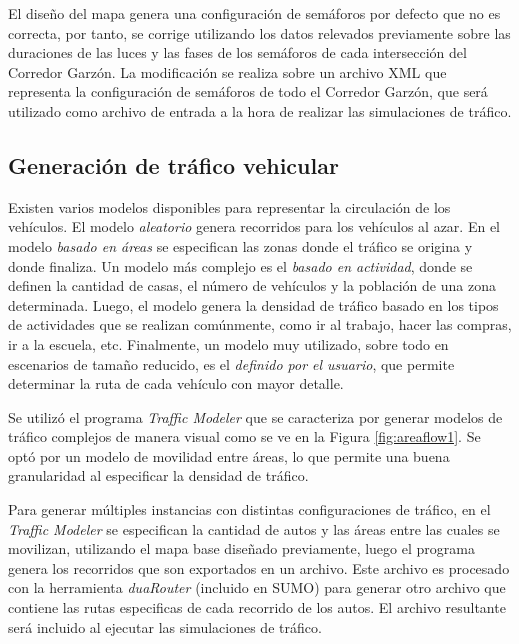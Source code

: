 El diseño del mapa genera una configuración de semáforos por defecto que no es correcta, por tanto, se corrige utilizando los datos relevados previamente sobre las duraciones de las luces y las fases de los semáforos de cada intersección del Corredor Garzón. La modificación se realiza sobre un archivo XML que representa la configuración de semáforos de todo el Corredor Garzón, que será utilizado como archivo de entrada a la hora de realizar las simulaciones de tráfico.

\subsection{Generación de tráfico vehicular}

Existen varios modelos disponibles para representar la circulación de los vehículos. El modelo \emph{aleatorio} genera recorridos para los vehículos al azar. En el modelo \emph{basado en áreas} se especifican las zonas donde el tráfico se origina y donde finaliza. Un modelo más complejo es el \emph{basado en actividad}, donde se definen la cantidad de casas, el número de vehículos y la población de una zona determinada. Luego, el modelo genera la densidad de tráfico basado en los tipos de actividades que se realizan comúnmente, como ir al trabajo, hacer las compras, ir a la escuela, etc. Finalmente, un modelo muy utilizado, sobre todo en escenarios de tamaño reducido, es el \emph{definido por el usuario}, que permite determinar la ruta de cada vehículo con mayor detalle.

Se utilizó el programa \emph{Traffic Modeler} \citep{TrafficModeler} que se caracteriza por generar modelos de tráfico complejos de manera visual como se ve en la Figura \ref{fig:areaflow1}. Se optó por un modelo de movilidad entre áreas, lo que permite una buena granularidad al especificar la densidad de tráfico. 

Para generar múltiples instancias con distintas configuraciones de tráfico, en el \emph{Traffic Modeler} se especifican la cantidad de autos y las áreas entre las cuales se movilizan, utilizando el mapa base diseñado previamente, luego el programa genera los recorridos que son exportados en un archivo. Este archivo es procesado con la herramienta \emph{duaRouter} (incluido en SUMO) para generar otro archivo que contiene las rutas especificas de cada recorrido de los autos. El archivo resultante será incluido al ejecutar las simulaciones de tráfico.






